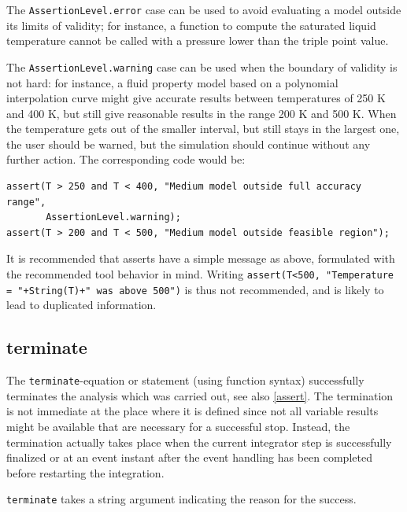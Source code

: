 \begin{nonnormative}
The \lstinline!AssertionLevel.error! case can be used to avoid evaluating a model outside its limits of validity; for instance, a function to compute the saturated liquid temperature cannot be called with a pressure lower than the triple point value.

The \lstinline!AssertionLevel.warning! case can be used when the boundary of validity is not hard: for instance, a fluid property model based on a polynomial interpolation curve might give accurate results between temperatures of 250 K and 400 K, but still give reasonable results in the range 200 K and 500 K.
When the temperature gets out of the smaller interval, but still stays in the largest one, the user should be warned, but the simulation should continue without any further action.
The corresponding code would be:
\begin{lstlisting}[language=modelica]
assert(T > 250 and T < 400, "Medium model outside full accuracy range",
       AssertionLevel.warning);
assert(T > 200 and T < 500, "Medium model outside feasible region");
\end{lstlisting}

It is recommended that asserts have a simple message as above, formulated with the recommended tool behavior in mind.
Writing \lstinline!assert(T<500, "Temperature = "+String(T)+" was above 500")! is thus not recommended, and is likely to lead to duplicated information.
\end{nonnormative}


\subsection{terminate}\label{terminate}

The \lstinline!terminate!-equation or statement (using function syntax) successfully terminates the analysis which was carried out, see also \cref{assert}.
The termination is not immediate at the place where it is defined since not all variable results might be available that are necessary for a successful stop.
Instead, the termination actually takes place when the current integrator step is successfully finalized or at an event instant after the event handling has been completed before restarting the integration.

\lstinline!terminate! takes a string argument indicating the reason for the success.


